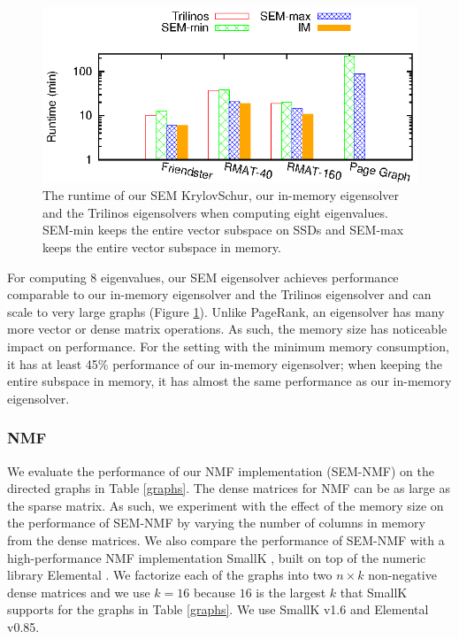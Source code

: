 \begin{figure}
	\begin{center}
		\footnotesize
		\includegraphics[scale=1]{SpMM_figs/eigen-runtime-8ev.eps}
		\caption{The runtime of our SEM KrylovSchur, our in-memory eigensolver
			and the Trilinos eigensolvers when computing eight
			eigenvalues. SEM-min keeps the entire vector subspace on SSDs and
		SEM-max keeps the entire vector subspace in memory.}
		\label{fig:eigen}
	\end{center}
\end{figure}

For computing 8 eigenvalues, our SEM eigensolver achieves performance
comparable to our in-memory eigensolver and the Trilinos eigensolver
and can scale to very large graphs (Figure \ref{fig:eigen}).
Unlike PageRank, an eigensolver has many more vector or dense matrix operations.
As such, the memory size has noticeable impact on performance.
For the setting with the minimum memory consumption, it has at least 45\%
performance of our in-memory eigensolver; when keeping the entire subspace
in memory, it has almost the same performance as our in-memory eigensolver.

\subsubsection{NMF}
We evaluate the performance of our NMF implementation (SEM-NMF) on the directed
graphs in Table \ref{graphs}. The dense matrices for NMF can be as large as
the sparse matrix. As such, we experiment with the effect of the memory size on
the performance of SEM-NMF by varying the number of columns in memory from
the dense matrices. We also compare the performance of SEM-NMF with
a high-performance NMF implementation SmallK \cite{SmallK}, built on top of
the numeric library Elemental \cite{elemental}. We factorize
each of the graphs into two $n \times k$ non-negative dense matrices and
we use $k=16$ because $16$ is the largest $k$ that SmallK supports for
the graphs in Table \ref{graphs}. We use SmallK v1.6 and Elemental v0.85.

